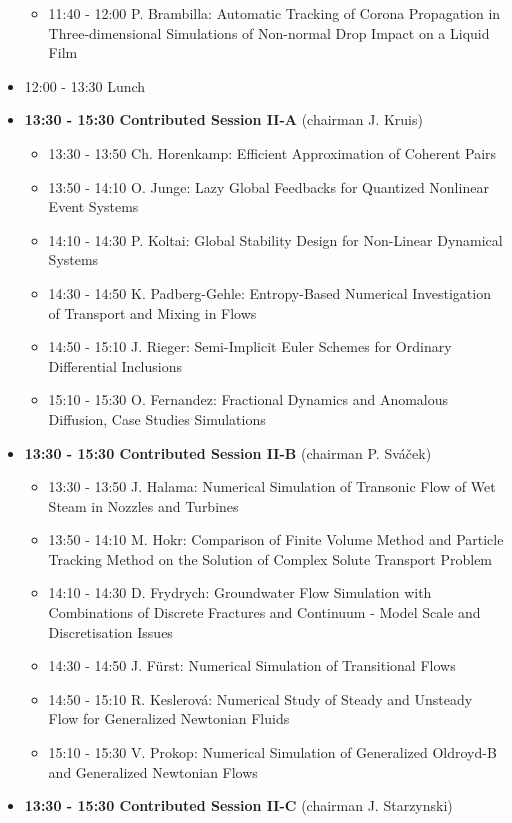\documentclass[10pt, A4]{article}%
\begin{document}
\begin{itemize}
\begin{itemize}
    \item 11:40 - 12:00 P. Brambilla: Automatic Tracking of Corona Propagation in Three-dimensional Simulations of Non-normal Drop Impact on a Liquid Film 
  \end{itemize}
  \item 12:00 - 13:30 Lunch
  \item {\bf 13:30 - 15:30 Contributed Session II-A} (chairman J. Kruis) 
  \begin{itemize}
    \item 13:30 - 13:50 Ch. Horenkamp: Efficient Approximation of Coherent Pairs
    \item 13:50 - 14:10 O. Junge: Lazy Global Feedbacks for Quantized Nonlinear Event Systems
    \item 14:10 - 14:30 P. Koltai: Global Stability Design for Non-Linear Dynamical Systems
    \item 14:30 - 14:50 K. Padberg-Gehle: Entropy-Based Numerical Investigation of Transport and Mixing in Flows
    \item 14:50 - 15:10 J. Rieger: Semi-Implicit Euler Schemes for Ordinary Differential Inclusions
    \item 15:10 - 15:30 O. Fernandez: Fractional Dynamics and Anomalous Diffusion, Case Studies Simulations
  \end{itemize}
  \item {\bf 13:30 - 15:30 Contributed Session II-B} (chairman P. Sv\'{a}\v{c}ek) 
  \begin{itemize}
    \item 13:30 - 13:50 J. Halama: Numerical Simulation of Transonic Flow of Wet Steam in Nozzles and Turbines
    \item 13:50 - 14:10 M. Hokr: Comparison of Finite Volume Method and Particle Tracking Method on the Solution of Complex Solute Transport Problem
    \item 14:10 - 14:30 D. Frydrych: Groundwater Flow Simulation with Combinations of Discrete Fractures and Continuum - Model Scale and Discretisation Issues
    \item 14:30 - 14:50 J. F\"{u}rst: Numerical Simulation of Transitional Flows
    \item 14:50 - 15:10 R. Keslerov\'{a}: Numerical Study of Steady and Unsteady Flow for Generalized Newtonian Fluids
    \item 15:10 - 15:30 V. Prokop: Numerical Simulation of Generalized Oldroyd-B and Generalized Newtonian Flows
  \end{itemize}
\newpage
    \item {\bf 13:30 - 15:30 Contributed Session II-C} (chairman J. Starzynski) 

\end{itemize}
\end{document}
